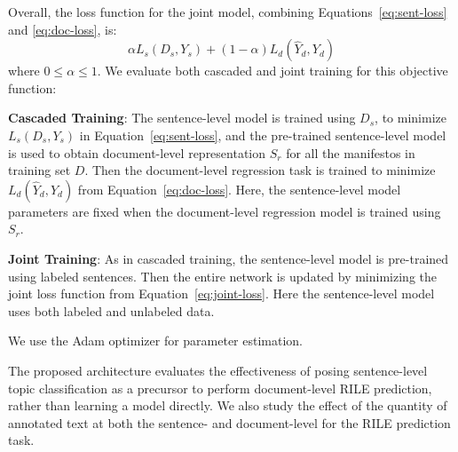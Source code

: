 \documentclass[11pt,a4paper]{article}
\newcommand{\eqnref}[2][]{Equation#1~\ref{#2}\xspace}
\begin{document}
Overall, the loss function for the joint model, combining \eqnref[s]{eq:sent-loss} and \ref{eq:doc-loss}, is:
\begin{equation}
 \alpha L_{s}(D_{s},Y_{s}) + (1-\alpha) L_{d}(\hat{Y}_{d}, Y_{d})
 \label{eq:joint-loss}
\end{equation}
where $0 \le \alpha \le 1$.
We evaluate both cascaded and joint training for this objective function:
\begin{description}
\item{\textbf{Cascaded Training}:} The sentence-level model is trained using $D_{s}$, to minimize $L_{s}(D_{s},Y_{s})$ in \eqnref{eq:sent-loss}, and the pre-trained sentence-level model is used to obtain document-level representation $S_{r}$ for all the manifestos in training set $D$. Then the document-level regression task is trained to minimize $L_{d}(\hat{Y}_{d}, Y_{d})$ from \eqnref{eq:doc-loss}. Here, the sentence-level model parameters are fixed when the document-level regression model is trained using $S_{r}$.

\item{\textbf{Joint Training}:} As in cascaded training, the sentence-level model is pre-trained using labeled sentences. Then the entire network is updated by minimizing the joint loss function from \eqnref{eq:joint-loss}. Here the sentence-level model uses both labeled and unlabeled data.
\end{description}

We use the Adam optimizer \cite{DBLP:journals/corr/KingmaB14} for parameter estimation. 

The proposed architecture evaluates the effectiveness of posing sentence-level topic classification as a precursor to perform document-level RILE prediction, rather than learning a model directly.  We also study the effect of the quantity of annotated text at both the sentence- and document-level for the RILE prediction task. 


\end{document}
